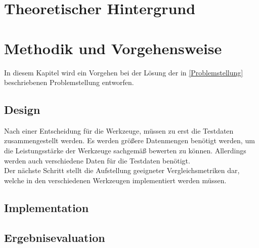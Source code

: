 \documentclass[
	12pt,
	a4paper,
	BCOR10mm,
	DIV14,
	listof=totoc,
	bibliography=totoc,
	headsepline
]{scrreprt}
\begin{document}
\chapter{Theoretischer Hintergrund}
\label{Theoretischer Hintergrund}

\chapter{Methodik und Vorgehensweise}
\label{Methodik und Vorgehensweise}
In diesem Kapitel wird ein Vorgehen bei der Lösung der in \ref{Problemstellung} beschriebenen Problemstellung entworfen.
\section{Design}
Nach einer Entscheidung für die Werkzeuge, müssen zu erst die Testdaten zusammengestellt werden.
Es werden größere Datenmengen benötigt werden, um die Leistungsstärke der Werkzeuge sachgemäß bewerten zu können.
Allerdings werden auch verschiedene Daten für die Testdaten benötigt. \\
Der nächste Schritt stellt die Aufstellung geeigneter Vergleichsmetriken dar, welche in den verschiedenen Werkzeugen implementiert werden müssen.

\section{Implementation}

\section{Ergebnisevaluation}
\end{document}
